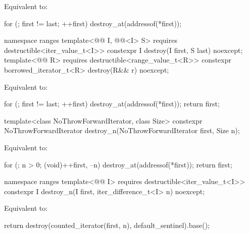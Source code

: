 \begin{itemdescr}
\pnum
\effects
Equivalent to:
\begin{codeblock}
for (; first != last; ++first)
  destroy_at(addressof(*first));
\end{codeblock}
\end{itemdescr}

%
\begin{itemdecl}
namespace ranges {
  template<@@ I, @@<I> S>
      requires destructible<iter_value_t<I>>
    constexpr I destroy(I first, S last) noexcept;
  template<@@ R>
      requires destructible<range_value_t<R>>
    constexpr borrowed_iterator_t<R> destroy(R&& r) noexcept;
}
\end{itemdecl}

\begin{itemdescr}
\pnum
\effects
Equivalent to:
\begin{codeblock}
for (; first != last; ++first)
  destroy_at(addressof(*first));
return first;
\end{codeblock}
\end{itemdescr}

%
\begin{itemdecl}
template<class NoThrowForwardIterator, class Size>
  constexpr NoThrowForwardIterator destroy_n(NoThrowForwardIterator first, Size n);
\end{itemdecl}

\begin{itemdescr}
\pnum
\effects
Equivalent to:
\begin{codeblock}
for (; n > 0; (void)++first, --n)
  destroy_at(addressof(*first));
return first;
\end{codeblock}
\end{itemdescr}

%
\begin{itemdecl}
namespace ranges {
  template<@@ I>
      requires destructible<iter_value_t<I>>
    constexpr I destroy_n(I first, iter_difference_t<I> n) noexcept;
}
\end{itemdecl}

\begin{itemdescr}
\pnum
\effects
Equivalent to:
\begin{codeblock}
return destroy(counted_iterator(first, n), default_sentinel).base();
\end{codeblock}
\end{itemdescr}

